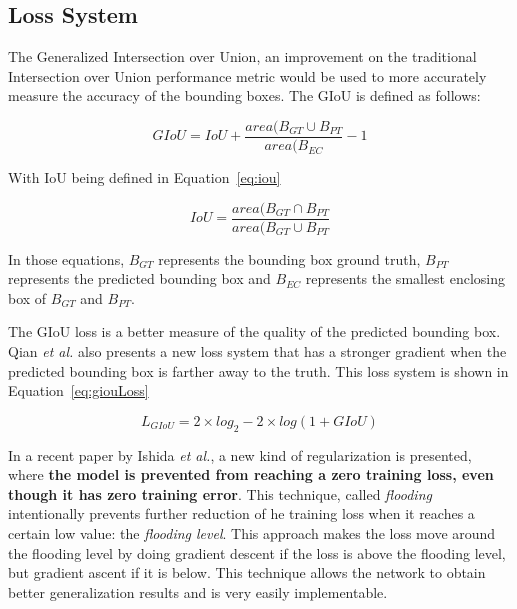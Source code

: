 \subsection{Loss System}
The Generalized Intersection over Union, an improvement on the traditional Intersection over Union performance metric would be used to more accurately measure the accuracy of the bounding boxes. The GIoU is defined as follows:

\begin{equation}
	GIoU = IoU + \frac{area(B_{GT} \cup B_{PT}}{area(B_{EC}} - 1
\label{eq:GIoU}
\end{equation}

With IoU being defined in Equation~\ref{eq:iou}

\begin{equation}\label{eq:iou}
	IoU = \frac{area(B_{GT} \cap B_{PT}}{area(B_{GT} \cup B_{PT}}
\end{equation}

In those equations, $B_{GT}$ represents the bounding box ground truth, $B_{PT}$ represents the predicted bounding box and $B_{EC}$ represents the smallest enclosing box of $B_{GT}$ and $B_{PT}$.

The GIoU loss is a better measure of the quality of the predicted bounding box. Qian \textit{et al.} also presents a new loss system that has a stronger gradient when the predicted bounding box is farther away to the truth. This loss system is shown in Equation~\ref{eq:giouLoss}

\begin{equation}\label{eq:giouLoss}
	L_{GIoU} = 2 \times log_2 - 2 \times log(1 + GIoU)
\end{equation}

In a recent paper by Ishida \textit{et al.}\cite{ishida2020}, a new kind of regularization is presented, where \textbf{the model is prevented from reaching a zero training loss, even though it has zero training error}. This technique, called \textit{flooding} intentionally prevents further reduction of he training loss when it reaches a certain low value: the \textit{flooding level}. This approach makes the loss move around the flooding level by doing gradient descent if the loss is above the flooding level, but gradient ascent if it is below. This technique allows the network to obtain better generalization results and is very easily implementable.

